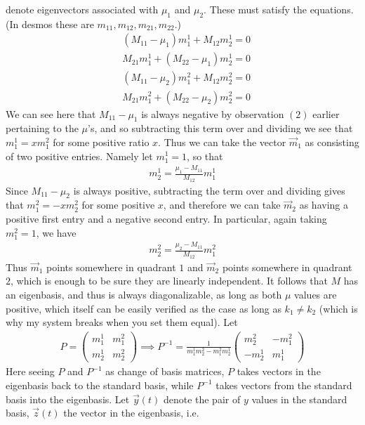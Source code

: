 \documentclass{article}
\theoremstyle{theorem}
\begin{document}
denote eigenvectors associated with $\mu_1$ and $\mu_2$. These must satisfy the equations. (In desmos these are $m_{11}, m_{12},m_{21},m_{22}$.) 
\begin{align}
	& (M_{11} - \mu_1)m^1_1 + M_{12}m^1_2 = 0  \label{e11}\\
	& M_{21}m^1_1 + (M_{22} - \mu_1)m^1_2 = 0 \label{e12}
\end{align}
\begin{align}
	& (M_{11} - \mu_2)m^2_1 + M_{12}m^2_2 = 0  \label{e21}\\
	& M_{21}m^2_1 + (M_{22} - \mu_2)m^2_2 = 0 \label{e22}
\end{align}
We can see here that $M_{11} - \mu_1$ is always negative by observation $(2)$ earlier pertaining to the $\mu$'s, and so subtracting this term over and dividing we see that $m^1_1 = xm^2_1$ for some positive ratio $x$. Thus we can take the vector $\vec{m}_1$ as consisting of two positive entries. Namely let $m^1_1 = 1$, so that 
\begin{align}
	m_2^1 = \frac{\mu_1-M_{11}}{M_{12}}m^1_1
\end{align}
 Since $M_{11} - \mu_2$ is always positive, subtracting the term over and dividing gives that $m^2_1 = -xm^2_2$ for some positive $x$, and therefore we can take $\vec{m}_2$ as having a positive first entry and a negative second entry. In particular, again taking $m^2_1 = 1$, we have
 \begin{align}
 	m^2_2 = \frac{\mu_2-M_{11}}{M_{12}}m^2_1
 \end{align}
  Thus $\vec{m}_1$ points somewhere in quadrant $1$ and $\vec{m}_2$ points somewhere in quadrant $2$, which is enough to be sure they are linearly independent. It follows that $M$ has an eigenbasis, and thus is always diagonalizable, as long as both $\mu$ values are positive, which itself can be easily verified as the case as long as $k_1 \neq k_2$ (which is why my system breaks when you set them equal). Let 
\begin{align}
	 P = \begin{pmatrix} m^1_1 & m^2_1 \\ m^1_2 & m^2_2 \end{pmatrix} \implies P^{-1} = \frac{1}{m^1_1m^2_2-m^2_1m^1_2} \begin{pmatrix} m^2_2 & -m^2_1 \\ -m^1_2 & m^1_1 \end{pmatrix} 
\end{align}
Here seeing $P$ and $P^{-1}$ as change of basis matrices, $P$ takes vectors in the eigenbasis back to the standard basis, while $P^{-1}$ takes vectors from the standard basis into the eigenbasis. Let $\vec{y}(t)$ denote the pair of $y$ values in the standard basis, $\vec{z}(t)$ the vector in the eigenbasis, i.e. 
\end{document}
